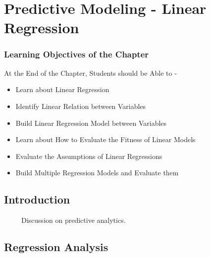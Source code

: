 \documentclass[
  letterpaper,
  DIV=11,
  numbers=noendperiod]{scrreprt}
\begin{document}
\chapter{Predictive Modeling - Linear
Regression}\label{predictive-modeling---linear-regression}

\subsection*{Learning Objectives of the
Chapter}\label{learning-objectives-of-the-chapter-6}

\begin{tcolorbox}[enhanced jigsaw, arc=.35mm, bottomrule=.15mm, bottomtitle=1mm, breakable, colback=white, colbacktitle=quarto-callout-note-color!10!white, colframe=quarto-callout-note-color-frame, coltitle=black, left=2mm, leftrule=.75mm, opacityback=0, opacitybacktitle=0.6, rightrule=.15mm, title=\textcolor{quarto-callout-note-color}{\faInfo}\hspace{0.5em}{Learning Objectives}, titlerule=0mm, toprule=.15mm, toptitle=1mm]

At the End of the Chapter, Students should be Able to -

\begin{itemize}
\item
  Learn about Linear Regression
\item
  Identify Linear Relation between Variables
\item
  Build Linear Regression Model between Variables
\item
  Learn about How to Evaluate the Fitness of Linear Models
\item
  Evaluate the Assumptions of Linear Regressions
\item
  Build Multiple Regression Models and Evaluate them
\end{itemize}

\end{tcolorbox}

\section{Introduction}\label{introduction-1}

~~~~~Discussion on predictive analytics.

\section{Regression Analysis}\label{regression-analysis}
\end{document}

